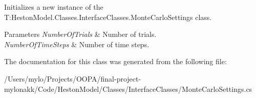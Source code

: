 Initializes a new instance of the T\+:\+Heston\+Model.\+Classes.\+Interface\+Classes.\+Monte\+Carlo\+Settings class. 


\begin{DoxyParams}{Parameters}
{\em Number\+Of\+Trials} & Number of trials.\\
\hline
{\em Number\+Of\+Time\+Steps} & Number of time steps.\\
\hline
\end{DoxyParams}


The documentation for this class was generated from the following file\+:\begin{DoxyCompactItemize}
\item 
/\+Users/mylo/\+Projects/\+O\+O\+P\+A/final-\/project-\/mylonakk/\+Code/\+Heston\+Model/\+Classes/\+Interface\+Classes/Monte\+Carlo\+Settings.\+cs\end{DoxyCompactItemize}
